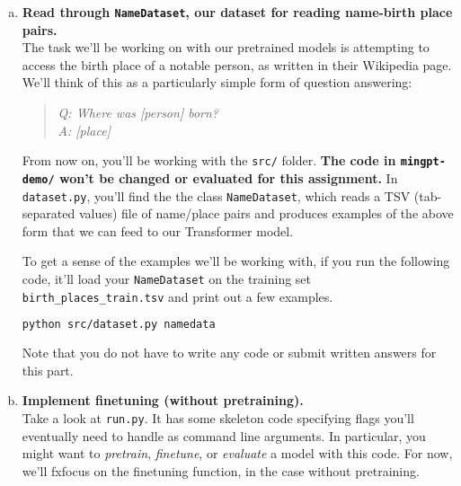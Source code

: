 \begin{enumerate}[(a)]
\item {} \textbf{Read through \texttt{NameDataset}, our dataset for reading name-birth place pairs.}\\
The task we'll be working on with our pretrained models is attempting to access the birth place of a notable person, as written in their Wikipedia page.
We'll think of this as a particularly simple form of question answering:
\begin{quote}
    \textit{Q: Where was \textit{[person]} born?}\\
    \textit{A: [place]}
\end{quote}
From now on, you'll be working with the \texttt{src/} folder. \textbf{The code in \texttt{mingpt-demo/} won't be changed or evaluated for this assignment.}
In \texttt{dataset.py}, 
you'll find the the class \texttt{NameDataset}, which reads a TSV (tab-separated values) file of name/place pairs and produces examples of the above form that we can feed to our Transformer model.


To get a sense of the examples we'll be working with, if you run the following code, it'll load your \texttt{NameDataset} on the training set \texttt{birth\_places\_train.tsv} and print out a few examples.
\begin{lstlisting}[language=bash]
    python src/dataset.py namedata 
\end{lstlisting}

Note that you do not have to write any code or submit written answers for this part.

\item {} \textbf{Implement finetuning (without pretraining).}\\
Take a look at \texttt{run.py}. It has some skeleton code specifying flags you'll eventually need to handle as command line arguments.
In particular, you might want to \textit{pretrain}, \textit{finetune}, or \textit{evaluate} a model with this code. For now, we'll fxfocus on the finetuning function, in the case without pretraining.


\end{enumerate}
